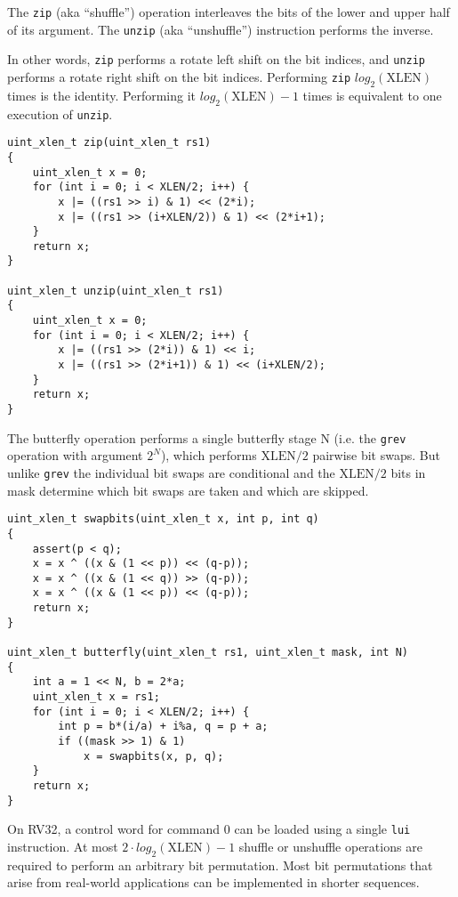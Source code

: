 The \texttt{zip} (aka ``shuffle'') operation interleaves the bits of the lower and upper
half of its argument. The \texttt{unzip} (aka ``unshuffle'') instruction performs the inverse.

In other words, \texttt{zip} performs a rotate left shift on the bit indices,
and \texttt{unzip} performs a rotate right shift on the bit indices.
Performing \texttt{zip} $log_2(\textrm{XLEN})$ times is the identity. Performing it
$log_2(\textrm{XLEN})-1$ times is equivalent to one execution of \texttt{unzip}.

\begin{verbatim}
uint_xlen_t zip(uint_xlen_t rs1)
{
    uint_xlen_t x = 0;
    for (int i = 0; i < XLEN/2; i++) {
        x |= ((rs1 >> i) & 1) << (2*i);
        x |= ((rs1 >> (i+XLEN/2)) & 1) << (2*i+1);
    }
    return x;
}

uint_xlen_t unzip(uint_xlen_t rs1)
{
    uint_xlen_t x = 0;
    for (int i = 0; i < XLEN/2; i++) {
        x |= ((rs1 >> (2*i)) & 1) << i;
        x |= ((rs1 >> (2*i+1)) & 1) << (i+XLEN/2);
    }
    return x;
}
\end{verbatim}

The butterfly operation performs a single butterfly stage N (i.e. the {\tt grev} operation
with argument $2^N$), which performs $\textrm{XLEN}/2$ pairwise bit swaps. But unlike
{\tt grev} the individual bit swaps are conditional and the $\textrm{XLEN}/2$
bits in mask determine which bit swaps are taken and which are skipped.

\begin{verbatim}
uint_xlen_t swapbits(uint_xlen_t x, int p, int q)
{
    assert(p < q);
    x = x ^ ((x & (1 << p)) << (q-p));
    x = x ^ ((x & (1 << q)) >> (q-p));
    x = x ^ ((x & (1 << p)) << (q-p));
    return x;
}

uint_xlen_t butterfly(uint_xlen_t rs1, uint_xlen_t mask, int N)
{
    int a = 1 << N, b = 2*a;
    uint_xlen_t x = rs1;
    for (int i = 0; i < XLEN/2; i++) {
        int p = b*(i/a) + i%a, q = p + a;
        if ((mask >> 1) & 1)
            x = swapbits(x, p, q);
    }
    return x;
}
\end{verbatim}

On RV32, a control word for command 0 can be loaded using a single \texttt{lui} instruction.
At most $2\cdot{}log_2(\textrm{XLEN})-1$ shuffle or unshuffle operations are required to
perform an arbitrary bit permutation. Most bit permutations that arise from real-world
applications can be implemented in shorter sequences.

